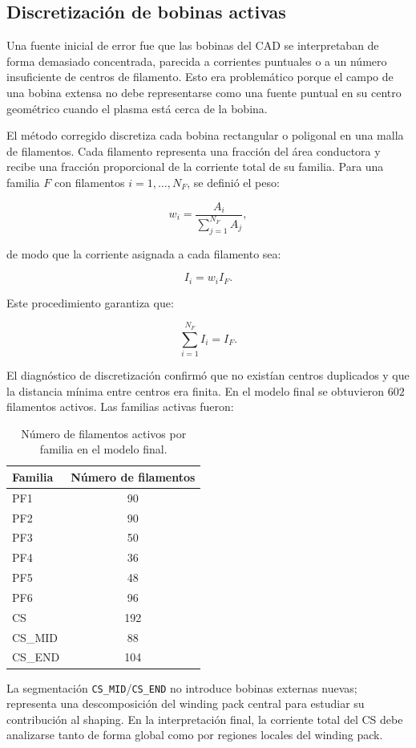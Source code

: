 \documentclass[11pt,a4paper]{article}
\begin{document}
\subsection{Discretización de bobinas activas}
Una fuente inicial de error fue que las bobinas del CAD se interpretaban de forma demasiado
concentrada, parecida a corrientes puntuales o a un número insuficiente de centros de filamento.
Esto era problemático porque el campo de una bobina extensa no debe representarse como una
fuente puntual en su centro geométrico cuando el plasma está cerca de la bobina.

El método corregido discretiza cada bobina rectangular o poligonal en una malla de filamentos.
Cada filamento representa una fracción del área conductora y recibe una fracción proporcional
de la corriente total de su familia. Para una familia $F$ con filamentos $i=1,\ldots,N_F$, se
definió el peso:

\[
w_i = \frac{A_i}{\sum_{j=1}^{N_F} A_j},
\]

de modo que la corriente asignada a cada filamento sea:

\[
I_i = w_i I_F.
\]

Este procedimiento garantiza que:

\[
\sum_{i=1}^{N_F} I_i = I_F.
\]

El diagnóstico de discretización confirmó que no existían centros duplicados y que la distancia
mínima entre centros era finita. En el modelo final se obtuvieron $602$ filamentos activos.
Las familias activas fueron:

\begin{table}[htbp]
\centering
\caption{Número de filamentos activos por familia en el modelo final.}
\label{tab:active_filaments_by_family}
\begin{tabular}{lc}
\toprule
\textbf{Familia} & \textbf{Número de filamentos} \\
\midrule
PF1 & 90 \\
PF2 & 90 \\
PF3 & 50 \\
PF4 & 36 \\
PF5 & 48 \\
PF6 & 96 \\
CS & 192 \\
CS\_MID & 88 \\
CS\_END & 104 \\
\bottomrule
\end{tabular}
\end{table}

La segmentación \texttt{CS\_MID}/\texttt{CS\_END} no introduce bobinas externas nuevas; representa
una descomposición del winding pack central para estudiar su contribución al shaping. En la
interpretación final, la corriente total del CS debe analizarse tanto de forma global como por
regiones locales del winding pack.
\end{document}
